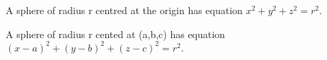 A sphere of radius r centred at the origin has equation $x^{2}+y^{2}+z^{2}=r^{2}.$ 
\par
A sphere of radius r cented at (a,b,c) has equation $(x-a)^{2}+(y-b)^{2}+(z-c)^{2}=r^{2}.$ 
